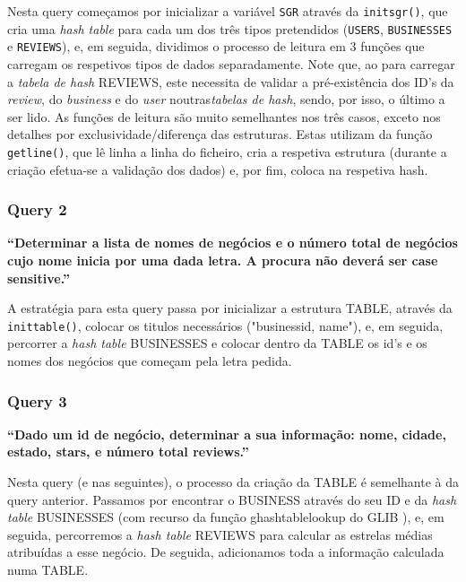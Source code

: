 \documentclass[a4paper]{article}
\begin{document}
Nesta query começamos por inicializar a variável \texttt{SGR} através da \texttt{init\textunderscore sgr()}, que cria uma \textit{hash table} para cada um dos três tipos pretendidos (\texttt{USERS}, \texttt{BUSINESSES} e \texttt{REVIEWS}), e, em seguida, dividimos o processo de leitura em 3 funções que carregam os respetivos tipos de dados separadamente. Note que, ao para carregar a \textit{tabela de hash} REVIEWS, este necessita de validar a pré-existência dos ID's da \textit{review}, do \textit{business} e do \textit{user} noutras\textit{tabelas de hash}, sendo, por isso, o último a ser lido. As funções de leitura são muito semelhantes nos três casos, exceto nos detalhes por exclusividade/diferença das estruturas. Estas utilizam da função  \texttt{getline()}\cite{getline}, que lê linha a linha do ficheiro, cria a respetiva estrutura (durante a criação efetua-se a validação dos dados) e, por fim, coloca na respetiva hash.

\subsubsection*{Query 2}
\label{sec:query2}

\textbf{“Determinar a lista de nomes de negócios e o número total de negócios cujo nome
inicia por uma dada letra. A procura não deverá ser case sensitive.”}

A estratégia para esta query passa por inicializar a estrutura TABLE, através da \texttt{init\textunderscore table()}, colocar os titulos necessários ("business\textunderscore id, name"), e, em seguida, percorrer a \textit{hash table} BUSINESSES e colocar dentro da TABLE os id's e os nomes dos negócios que começam pela letra pedida.

\subsubsection*{Query 3}
\label{sec:query3}

\textbf{“Dado um id de negócio, determinar a sua informação: nome, cidade, estado, stars,
e número total reviews.”}

Nesta query (e nas seguintes), o processo da criação da TABLE é semelhante à da query anterior. Passamos por encontrar o BUSINESS através do seu ID e da \textit{hash table} BUSINESSES (com recurso da função g\textunderscore hash\textunderscore table\textunderscore lookup do GLIB \cite{ghtLookup}), e, em seguida, percorremos a \textit{hash table} REVIEWS para calcular as estrelas médias atribuídas a esse negócio. De seguida, adicionamos toda a informação calculada numa TABLE.
\end{document}
